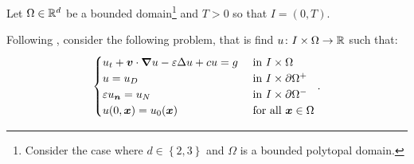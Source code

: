 Let $\Omega \in \mathbb{R}^{d}$ be a bounded domain\footnote{Consider the case where $d \in \left\{ 2, 3 \right\}$ and $\Omega$ is a bounded polytopal domain.} and $T > 0$ so that $I = \left( 0, T\right)$.

Following \cite{Feistauer2007}, consider the following problem, that is find $u \colon I \times \Omega \rightarrow \mathbb{R}$ such that:
\begin{gather}
    \begin{cases}
        u_t + \bm{v} \cdot \bm{\nabla} u - \varepsilon \Delta u + c u = g & \text{ in } I \times \Omega \\
        u = u_D & \text{ in } I \times \partial \Omega^+ \\
        \varepsilon u_{\bm{n}} = u_N & \text{ in } I \times \partial \Omega^- \\
        u(0, \bm{x}) = u_0(\bm{x}) & \text{ for all } \bm{x} \in \Omega
    \end{cases}.
\end{gather}